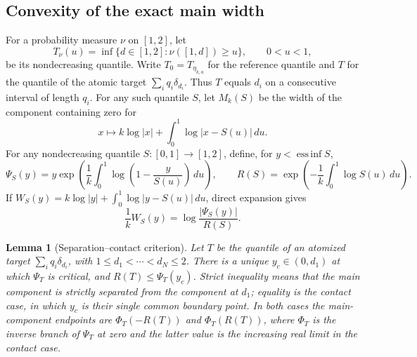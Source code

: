 \documentclass[11pt]{article}
\numberwithin{equation}{section}
\theoremstyle{plain}
\newtheorem{lemma}[theorem]{Lemma}
\theoremstyle{definition}
\theoremstyle{remark}
\newcommand{\1}{\mathbf 1}
\newcommand{\dd}{\,d}
\begin{document}
\subsection{Convexity of the exact main width}

For a probability measure $\nu$ on $[1,2]$, let
\[
 T_\nu(u)=\inf\{d\in[1,2]:\nu([1,d])\ge u\},
 \qquad 0<u<1,
\]
be its nondecreasing quantile.  Write $T_0=T_{\eta_{k,a}}$ for the
reference quantile and $T$ for the quantile of the atomic target
$\sum_iq_i\delta_{d_i}$.  Thus $T$ equals $d_i$ on a consecutive
interval of length $q_i$.  For any such quantile $S$, let $M_k(S)$ be the
width of the component containing zero for
\[
 x\longmapsto k\log|x|+\int_0^1\log|x-S(u)|\dd u.
\]
For any nondecreasing quantile $S:[0,1]\to[1,2]$, define, for
$y<\operatorname*{ess\,inf}S$,
\begin{equation}
 \Psi_S(y)=y\exp\left(\frac1k\int_0^1
        \log\left(1-\frac{y}{S(u)}\right)\dd u\right),\qquad
 R(S)=\exp\left(-\frac1k\int_0^1\log S(u)\dd u\right).
\label{eq:4.11}
\end{equation}
If $W_S(y)=k\log|y|+\int_0^1\log|y-S(u)|\dd u$, direct expansion gives
\[
 \frac1kW_S(y)=\log\frac{|\Psi_S(y)|}{R(S)}.
\]

\begin{lemma}[Separation--contact criterion]\label{lem:separation}
Let $T$ be the quantile of an atomized target
$\sum_iq_i\delta_{d_i}$, with $1\le d_1<\cdots<d_N\le2$.  There is a
unique $y_c\in(0,d_1)$ at which $\Psi_T$ is critical, and
$R(T)\le\Psi_T(y_c)$.  Strict inequality means that the main component is
\emph{strictly separated} from the component at $d_1$; equality is the
\emph{contact} case, in which $y_c$ is their single common boundary point.
In both cases the main-component endpoints are $\Phi_T(-R(T))$ and
$\Phi_T(R(T))$, where $\Phi_T$ is the inverse branch of $\Psi_T$ at zero
and the latter value is the increasing real limit in the contact case.
\end{lemma}
\end{document}
